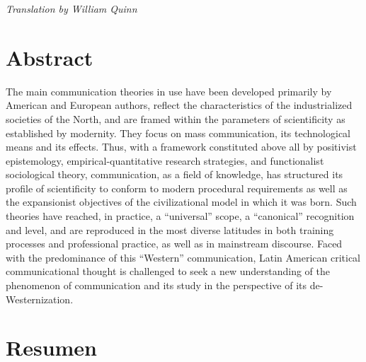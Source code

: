 \documentclass{tufte-handout}
\begin{document}
\begin{titlepage}
\vspace*{1em}




\noindent\emph{Translation by William Quinn}

\hypertarget{abstract}{%
\section{Abstract}\label{abstract}}

The main communication theories in use have been developed primarily by
American and European authors, reflect the characteristics of the
industrialized societies of the North, and are framed within the
parameters of scientificity as established by modernity. They focus on
mass communication, its technological means and its effects. Thus, with
a framework constituted above all by positivist epistemology,
empirical-quantitative research strategies, and functionalist
sociological theory, communication, as a field of knowledge, has
structured its profile of scientificity to conform to modern procedural
requirements as well as the expansionist objectives of the
civilizational model in which it was born. Such theories have reached,
in practice, a ``universal'' scope, a ``canonical'' recognition and
level, and are reproduced in the most diverse latitudes in both training
processes and professional practice, as well as in mainstream discourse.
Faced with the predominance of this ``Western'' communication, Latin
American critical communicational thought is challenged to seek a new
understanding of the phenomenon of communication and its study in the
perspective of its de-Westernization. 

\vspace*{6em}


\hypertarget{resumen}{%
\section{Resumen}\label{resumen}}


\end{titlepage}
\end{document}
